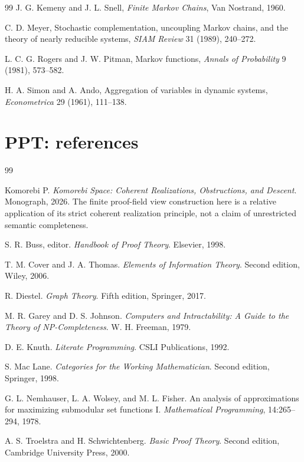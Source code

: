 \documentclass[11pt,oneside,openany]{book}
\numberwithin{equation}{section}
\begin{document}
\begin{thebibliography}{99}
J. G. Kemeny and J. L. Snell,
\emph{Finite Markov Chains},
Van Nostrand, 1960.

C. D. Meyer,
Stochastic complementation, uncoupling Markov chains, and the theory of nearly reducible systems,
\emph{SIAM Review} 31 (1989), 240--272.

L. C. G. Rogers and J. W. Pitman,
Markov functions,
\emph{Annals of Probability} 9 (1981), 573--582.

H. A. Simon and A. Ando,
Aggregation of variables in dynamic systems,
\emph{Econometrica} 29 (1961), 111--138.

\end{thebibliography}


\chapter{PPT: references}
\begin{thebibliography}{99}

Komorebi P.
\textit{Komorebi Space: Coherent Realizations, Obstructions, and Descent}.
Monograph, 2026. The finite proof-field view construction here is a relative application of its strict coherent realization principle, not a claim of unrestricted semantic completeness.

S. R. Buss, editor.
\textit{Handbook of Proof Theory}.
Elsevier, 1998.

T. M. Cover and J. A. Thomas.
\textit{Elements of Information Theory}.
Second edition, Wiley, 2006.

R. Diestel.
\textit{Graph Theory}.
Fifth edition, Springer, 2017.

M. R. Garey and D. S. Johnson.
\textit{Computers and Intractability: A Guide to the Theory of NP-Completeness}.
W. H. Freeman, 1979.

D. E. Knuth.
\textit{Literate Programming}.
CSLI Publications, 1992.

S. Mac Lane.
\textit{Categories for the Working Mathematician}.
Second edition, Springer, 1998.

G. L. Nemhauser, L. A. Wolsey, and M. L. Fisher.
An analysis of approximations for maximizing submodular set functions I.
\textit{Mathematical Programming}, 14:265--294, 1978.

A. S. Troelstra and H. Schwichtenberg.
\textit{Basic Proof Theory}.
Second edition, Cambridge University Press, 2000.

\end{thebibliography}
\end{document}
